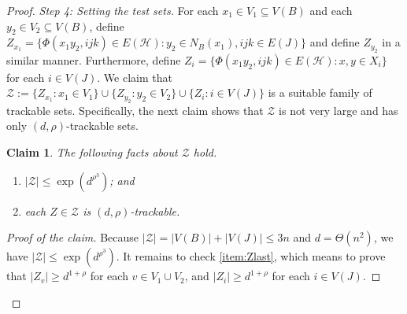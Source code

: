 \documentclass[a4paper, 11pt,reqno]{amsart}
\newcommand{\calZ}{\mathcal{Z}}
\theoremstyle{plain}
\newtheorem{claim}[theorem]{Claim}
\theoremstyle{definition}
\numberwithin{equation}{section}
\newenvironment{proofclaim}[1][Proof of the claim]{\begin{proof}[#1]\renewcommand*{\qedsymbol}{\(\square\)}}{\end{proof}}
\renewcommand*{\qedsymbol}{\(\blacksquare\)}
\begin{document}
\begin{proof}
\medskip

\noindent \emph{Step 4: Setting the test sets.}
For each $x_1 \in V_1 \subseteq V(B)$ and each $y_2 \in V_2 \subseteq V(B)$, define
$Z_{x_1} = \{ \Phi(x_1 y_2, ijk ) \in E(\mathcal{H}) : y_2 \in N_B(x_1), ijk \in E(J)\}$ 
and define $Z_{y_2}$ in a similar manner.  Furthermore, define 
$Z_i = \{ \Phi(x_1 y_2, ijk ) \in E(\mathcal{H}) : x, y \in X_i\}$ for each $i \in V(J)$. 
We claim that $\mathcal{Z} := \{Z_{x_1} : x_1 \in V_1 \} \cup \{ Z_{y_2} : y_2 \in V_2 \} 
\cup \{Z_{i} : i \in V(J)\}$ is a suitable family of trackable sets.
Specifically, the next claim shows that $\calZ$ is not very large and has only $(d,\rho)$-trackable sets.

\begin{claim} \label{claim:trackable}
	The following facts about $\calZ$ hold.
	\begin{enumerate}[\upshape{\textbf{(Z\arabic*)}},labelindent=0pt,labelwidth=\widthof{\ref{item:Zlast}},leftmargin=!]
		\item $|\mathcal{Z}| \leq \exp(d^{\rho^3})$; and
		\item \label{item:Zlast} each $Z \in \mathcal{Z}$ is $(d,\rho)$-trackable.
	\end{enumerate}
\end{claim}

\begin{proofclaim}
	Because $| \mathcal{Z} | = |V(B)| + |V(J)| \leq 3n$ and
	$d=\Theta(n^2)$, we have ${|\mathcal{Z}| \leq \exp(d^{\rho^3})}$.  
	It remains to check \ref{item:Zlast}, which means to prove that $|Z_v| \geq d^{1+\rho}$ for each $v \in V_1 \cup V_2$, and $|Z_i| \geq d^{1+\rho}$ for each $i \in V(J)$.
	

\end{proofclaim}
\end{proof}
\end{document}
